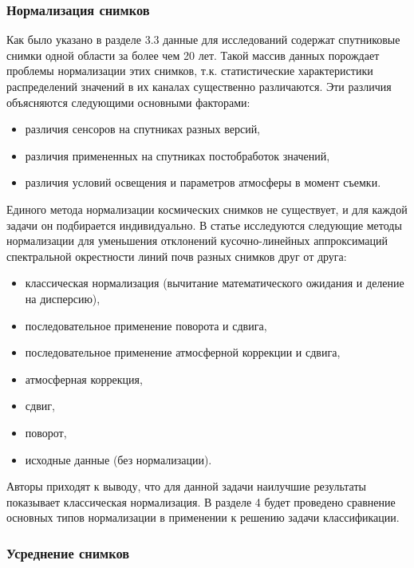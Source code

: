 \documentclass[14pt]{extarticle}
\begin{document}
\subsubsection{Нормализация снимков}

\par
Как было указано в разделе 3.3 данные для исследований содержат спутниковые снимки
одной области за более чем 20 лет. Такой массив данных порождает проблемы нормализации этих снимков,
т.к. статистические характеристики распределений значений в их каналах существенно различаются.
Эти различия объясняются следующими основными факторами:
\begin{itemize}
    \item различия сенсоров на спутниках разных версий,
    \item различия примененных на спутниках постобработок значений,
    \item различия условий освещения и параметров атмосферы в момент съемки.
\end{itemize}
\par
Единого метода нормализации космических снимков не существует, и для каждой задачи он
подбирается индивидуально. В статье \cite{rukhovich-2} исследуются следующие методы нормализации
для уменьшения отклонений кусочно-линейных аппроксимаций спектральной окрестности линий почв
разных снимков друг от друга:
\begin{itemize}
    \item классическая нормализация (вычитание математического ожидания и деление на дисперсию),
    \item последовательное применение поворота и сдвига,
    \item последовательное применение атмосферной коррекции и сдвига,
    \item атмосферная коррекция,
    \item сдвиг,
    \item поворот,
    \item исходные данные (без нормализации).
\end{itemize}
Авторы приходят к выводу, что для данной задачи наилучшие результаты 
показывает классическая нормализация. В разделе 4 будет проведено сравнение основных
типов нормализации в применении к решению задачи классификации.

\subsubsection{Усреднение снимков}
\end{document}
